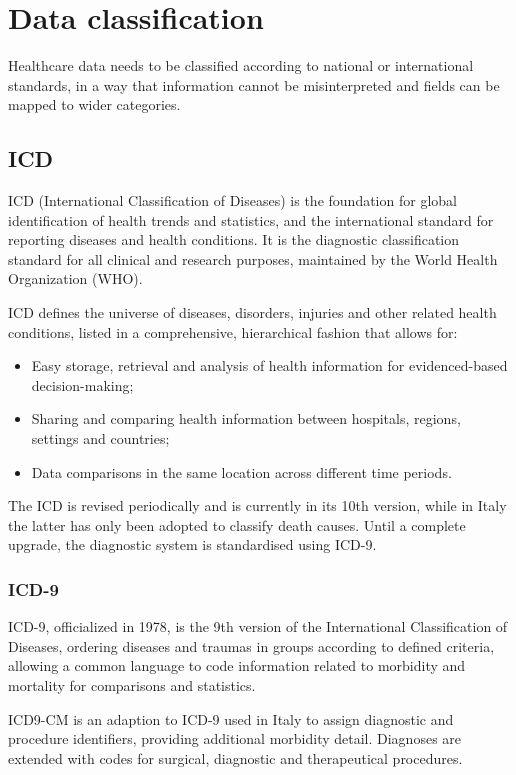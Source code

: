 \section{Data classification}
Healthcare data needs to be classified according to national or international standards, in a way that information cannot be misinterpreted and fields can be mapped to wider categories.

\subsection{ICD}
ICD (International Classification of Diseases) is the foundation for global identification of health trends and statistics, and the international standard for reporting diseases and health conditions. It is the diagnostic classification standard for all clinical and research purposes\cite{who}, maintained by the World Health Organization (WHO).

ICD defines the universe of diseases, disorders, injuries and other related health conditions, listed in a comprehensive, hierarchical fashion that allows for: 
\begin{itemize}
	\item Easy storage, retrieval and analysis of health information for evidenced-based decision-making;
	\item Sharing and comparing health information between hospitals, regions, settings and countries;
	\item Data comparisons in the same location across different time periods\cite{who}.
\end{itemize}

The ICD is revised periodically and is currently in its 10th version, while in Italy the latter has only been adopted to classify death causes\cite{icdit}. Until a complete upgrade, the diagnostic system is standardised using ICD-9.

\subsubsection{ICD-9}
ICD-9, officialized in 1978, is the 9th version of the International Classification of Diseases, ordering diseases and traumas in groups according to defined criteria, allowing a common language to code information related to morbidity and mortality for comparisons and statistics\cite{icdit}.

ICD9-CM is an adaption to ICD-9 used in Italy to assign diagnostic and procedure identifiers, providing additional morbidity detail. Diagnoses are extended with codes for surgical, diagnostic and therapeutical procedures. 

